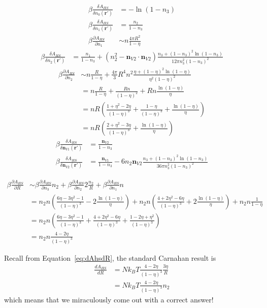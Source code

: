 \begin{align}
    \beta\frac{\delta A_{HS}}{\delta n_0(\mathbf{r}')} &= -\ln(1-n_3)
    \\
    \beta\frac{\delta A_{HS}}{\delta n_1(\mathbf{r}')} &= \frac{n_2}{1-n_3}
    \\
    \beta\frac{\partial A_{HS}}{\partial n_1}
    &\sim n \frac{4\pi R^2}{1-\eta}
\end{align}
\begin{align}
    \beta\frac{\delta A_{HS}}{\delta n_2(\mathbf{r}')} &=
      \frac{n_1}{1-n_3}
      + (n_2^2 - \mathbf{n}_{V2}\cdot\mathbf{n}_{V2})\frac{n_3 +
        (1-n_3)^2\ln(1-n_3)}{
        12\pi n_3^2(1-n_3)^2
      }
\end{align}
\begin{align}
    \beta\frac{\partial A_{HS}}{\partial n_2}
    &\sim n\frac{R}{1-\eta} +
    \frac{4\pi}{3} R^4 n^2 \frac{\eta + (1-\eta)^2\ln(1-\eta)}{\eta^2(1-\eta)^2}
    \\
    &= n\frac{R}{1-\eta} +
    \frac{R n}{(1-\eta)^2}
    + Rn \frac{\ln(1-\eta)}{\eta}
    \\
    &= nR\left( \frac{1 + \eta^2  - 2\eta}{(1-\eta)^3} +
      \frac{1 - \eta}{(1-\eta)^3}
    + \frac{\ln(1-\eta)}{\eta}
    \right)
    \\
    &= nR\left( \frac{2 + \eta^2  - 3\eta}{(1-\eta)^3}
    + \frac{\ln(1-\eta)}{\eta}
    \right)
\end{align}
\begin{align}
    \beta\frac{\delta A_{HS}}{\delta \mathbf{n}_{V1}(\mathbf{r}')} &=
      \frac{\mathbf{n}_{V2}}{1-n_3}
    \\
    \beta\frac{\delta A_{HS}}{\delta \mathbf{n}_{V2}(\mathbf{r}')} &=
      \frac{\mathbf{n}_{V1}}{1-n_3}
      - 6 n_2 \mathbf{n}_{V2} \frac{n_3 +
        (1-n_3)^2\ln(1-n_3)}{
        36\pi n_3^2(1-n_3)^2
      }
  \end{align}

\begin{widetext}
\begin{align}
  \beta \frac{\partial A_{HS}}{\partial R} &\sim
    \beta \frac{\partial A_{HS}}{\partial n_3} n_2 +
    \beta \frac{\partial A_{HS}}{\partial n_2} 2 \frac{n_2}{R} +
    \beta \frac{\partial A_{HS}}{\partial n_1} n
  \\
  &=
    n_2n \left(
      \frac{6\eta - 3\eta^2 - 1}{(1-\eta)^3} -
      2\frac{\ln(1-\eta)}{\eta}
    \right) +
    n_2n \left( \frac{4+2\eta^2-6\eta}{(1-\eta)^3} + 2\frac{\ln(1-\eta)}{\eta} \right) +
    n_2n\frac{1}{1-\eta}
  \\
  &=
    n_2n \left(
      \frac{6\eta - 3\eta^2 - 1}{(1-\eta)^3} +
    \frac{4+2\eta^2-6\eta}{(1-\eta)^3} +
    \frac{1 - 2\eta + \eta^2}{(1-\eta)^3}
  \right)
  \\
  &=
    n_2n \frac{4 - 2\eta}{(1-\eta)^3}
\end{align}
\end{widetext}
Recall from Equation~\ref{eq:dAhsdR}, the standard Carnahan result is
\begin{align}
  \frac{dA_{HS}}{dR}
  &= Nk_BT \frac{4 - 2\eta}{(1-\eta)^3} \frac{3 \eta}{R}
  \\ &= Nk_BT \frac{4 - 2\eta}{(1-\eta)^3} n_2
\end{align}
which means that we miraculously come out with a correct answer!

